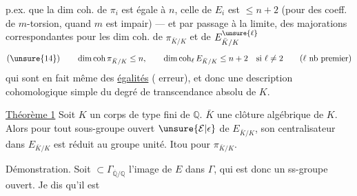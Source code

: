 p.ex. que la dim coh. de $\pi_i$ est égale à $n$, celle de $E_i$ est $\leq n+2$ (pour des coeff.  de $m$-torsion, quand $m$ est impair) --- et par passage à la limite, des majorations correspondantes pour les dim coh. de $\pi_{\bar K/K}$ et de $E_{\bar K/K}^{\unsure{\ell}}$
\[
(\unsure{14})\qquad \dim\operatorname{coh}\pi_{\bar K/K}\leq n,\qquad
\dim\operatorname{coh}_{\ell}E_{\bar K/K}\leq n+2\quad\text{si }\ell\neq2
\qquad(\ell\text{ nb premier})
\]
qui sont en fait même des \uline{égalités} ( erreur), et  donc une description cohomologique simple du degré de transcendance absolu de $K$.

\uline{Théorème 1} Soit $K$ un corps  de type fini de $\mathbb Q$.  $\bar K$ une clôture algébrique de $K$. Alors pour tout sous-groupe ouvert $\unsure{\mathcal E|\epsilon}$ de $E_{\bar K/K}$, son centralisateur dans $E_{\bar K/K}$ est réduit au groupe unité. Itou pour $\pi_{\bar K/K}$.

Démonstration. Soit $\subset\Gamma_{\overline{\mathbb Q}/\mathbb Q}$ l'image de $E$ dans $\Gamma$, qui est donc un ss-groupe ouvert.   Je dis qu'il est
